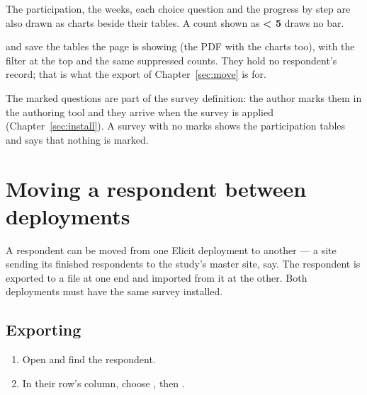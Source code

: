\documentclass[11pt, a4paper]{article}
\newcommand{\adminonly}{%
  \marginpar{\raggedright\footnotesize\textcolor{elicitVerdigris}{\textsf{Administrator}}}%
}
\begin{document}
The participation, the weeks, each choice question and the progress by step are also drawn as
charts beside their tables. A count shown as \textbf{< 5} draws no bar.

 and  save the tables the page is showing (the PDF with the
charts too), with the filter at the
top and the same suppressed counts. They hold no respondent's record; that is what the export of
Chapter~\ref{sec:move} is for.

\begin{elicitnote}
The marked questions are part of the survey definition: the author marks them in the authoring
tool and they arrive when the survey is applied (Chapter~\ref{sec:install}). A survey with no marks shows the
participation tables and says that nothing is marked.
\end{elicitnote}


\section{Moving a respondent between deployments}\adminonly
\label{sec:move}

A respondent can be moved from one Elicit deployment to another — a site sending its finished
respondents to the study's master site, say. The respondent is exported to a file at one end and
imported from it at the other. Both deployments must have the same survey installed.

\subsection{Exporting}

\begin{enumerate}
  \item Open  and find the respondent.
  \item In their row's  column, choose , then .
\end{enumerate}

\end{document}
